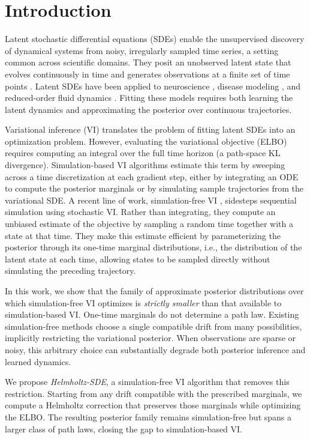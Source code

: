 \section{Introduction}
Latent stochastic differential equations (SDEs) enable the unsupervised discovery of dynamical systems from noisy, irregularly sampled time series, a setting common across scientific domains. 
They posit an unobserved latent state that evolves continuously in time and generates observations at a finite set of time points \cite{archambeau2007gaussian, li2020scalable}. 
Latent SDEs have been applied to neuroscience \cite{elgazzar2024universal, hu2024modeling}, disease modeling \cite{durso2024probabilistic}, and reduced-order fluid dynamics \cite{course2023state}.
Fitting these models requires both learning the latent dynamics and approximating the posterior over continuous trajectories.

Variational inference (VI) translates the problem of fitting latent SDEs into an optimization problem. 
However, evaluating the variational objective (ELBO) requires computing an integral over the full time horizon (a path-space KL divergence).
Simulation-based VI algorithms estimate this term by sweeping across a time discretization at each gradient step, either by integrating an ODE to compute the posterior marginals or by simulating sample trajectories from the variational SDE.
A recent line of work, simulation-free VI  \cite{course2023state,course2023amortized,bartosh2025sde}, sidesteps sequential simulation using stochastic VI. 
Rather than integrating, they compute an unbiased estimate of the objective by sampling a random time together with a state at that time.
They make this estimate efficient by parameterizing the posterior through its one-time marginal distributions, i.e., the distribution of the latent state at each time, allowing states to be sampled directly without simulating the preceding trajectory.

In this work, we show that the family of approximate posterior distributions over which simulation-free VI optimizes is \emph{strictly smaller} than that available to simulation-based VI.
One-time marginals do not determine a path law.
Existing simulation-free methods choose a single compatible drift from many possibilities, implicitly restricting the variational posterior. 
When observations are sparse or noisy, this arbitrary choice can substantially degrade both posterior inference and learned dynamics.

We propose \emph{Helmholtz-SDE}, a simulation-free VI algorithm that removes this restriction. 
Starting from any drift compatible with the prescribed marginals, we compute a Helmholtz correction that preserves those marginals while optimizing the ELBO. 
The resulting posterior family remains simulation-free but spans a larger class of path laws, closing the gap to simulation-based VI.